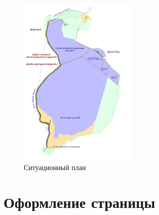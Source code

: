 \documentclass[a4paper,12pt]{article}
\begin{document}
\begin{figure}[h]
    \centering
    \includegraphics[width=0.5\textwidth]{images/photo.jpg}
    \caption{Ситуационный план}
    \label{fig:1}
\end{figure}

\section{Оформление страницы} 
\end{document}
